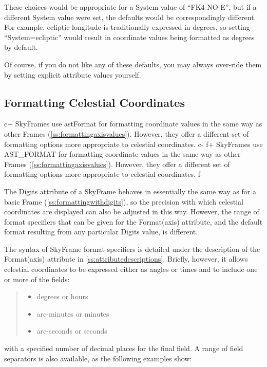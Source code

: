 \documentclass[twoside,11pt]{article}
\newcommand{\appref}[1]{Appendix~\ref{#1}}
\newcommand{\secref}[1]{\S\ref{#1}}
\renewcommand{\appref}[1]{\ref{#1}}
\renewcommand{\secref}[1]{\ref{#1}}
\begin{document}
These choices would be appropriate for a System value of ``FK4-NO-E'',
but if a different System value were set, the defaults would be
correspondingly different. For example, ecliptic longitude is
traditionally expressed in degrees, so setting ``System=ecliptic''
would result in coordinate values being formatted as degrees by
default.

Of course, if you do not like any of these defaults, you may always
over-ride them by setting explicit attribute values yourself.

\subsection{\label{ss:formattingskyaxisvalues}Formatting Celestial Coordinates}

c+
SkyFrames use astFormat for formatting coordinate values in the same
way as other Frames (\secref{ss:formattingaxisvalues}). However, they
offer a different set of formatting options more appropriate to
celestial coordinates.
c-
f+
SkyFrames use AST\_FORMAT for formatting coordinate values in the same
way as other Frames (\secref{ss:formattingaxisvalues}). However, they
offer a different set of formatting options more appropriate to
celestial coordinates.
f-

The Digits attribute of a SkyFrame behaves in essentially the same way
as for a basic Frame (\secref{ss:formattingwithdigits}), so the
precision with which celestial coordinates are displayed can also be
adjusted in this way. However, the range of format specifiers that can
be given for the Format(axis) attribute, and the default format
resulting from any particular Digits value, is different.

The syntax of SkyFrame format specifiers is detailed under the
description of the Format(axis) attribute in
\appref{ss:attributedescriptions}.  Briefly, however, it allows
celestial coordinates to be expressed either as angles or times and to
include one or more of the fields:

\begin{quote}
\begin{itemize}
\item degrees or hours
\item arc-minutes or minutes
\item arc-seconds or seconds
\end{itemize}
\end{quote}

with a specified number of decimal places for the final field. A range
of field separators is also available, as the following examples show:
\end{document}
